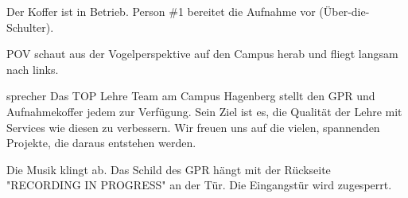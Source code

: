 \documentclass{screenplay}
\begin{document}
	Der Koffer ist in Betrieb. Person \#1 bereitet die Aufnahme vor (Über-die-Schulter).
	
	
	POV schaut aus der Vogelperspektive auf den Campus herab und fliegt langsam nach links.
	
	\begin{dialogue}{sprecher}
		Das TOP Lehre Team am Campus Hagenberg stellt den GPR und Aufnahmekoffer jedem zur Verfügung. Sein Ziel ist es, die Qualität der Lehre mit Services wie diesen zu verbessern. Wir freuen uns auf die vielen, spannenden Projekte, die daraus entstehen werden.
	\end{dialogue}
	
	
	Die Musik klingt ab. Das Schild des GPR hängt mit der Rückseite "RECORDING IN PROGRESS" an der Tür. Die Eingangstür wird zugesperrt.
	
	\fadeout
	\theend
\end{document}
